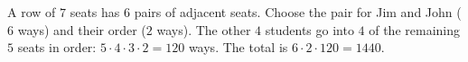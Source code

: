 A row of $7$ seats has $6$ pairs of adjacent seats. Choose the pair for Jim and John ($6$ ways) and their order ($2$ ways). The other $4$ students go into $4$ of the remaining $5$ seats in order: $5\cdot4\cdot3\cdot2=120$ ways. The total is $6\cdot2\cdot120=\boxed{1440}$.
